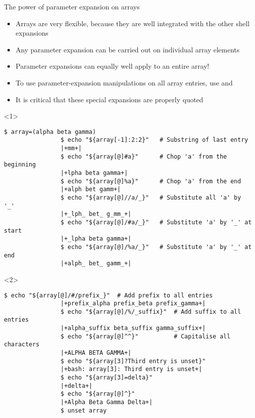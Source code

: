 \begin{frame}[fragile]{The power of parameter expansion on arrays}
    \vspace{-5mm}
    \begin{overlayarea}{\textwidth}{0.7\textheight}
         \begin{itemize}
             \item Arrays are very flexible, because they are well integrated with the other shell expansions
             \item Any parameter expansion can be carried out on individual array elements
             \item Parameter expansions can equally well apply to an entire array!
             \item To use parameter-expansion manipulations on all array entries, use \PB{\texttt{[@]}} and \PB{\texttt{[*]}}
             \item It is critical that these special expansions are properly quoted
         \end{itemize}
        \begin{onlyenv}<1>
            \begin{lstlisting}[style=MyBash, xrightmargin=3mm]
                $ array=(alpha beta gamma)
                $ echo "${array[-1]:2:2}"   # Substring of last entry
                |+mm+|
                $ echo "${array[@]#a}"      # Chop 'a' from the beginning
                |+lpha beta gamma+|
                $ echo "${array[@]%a}"      # Chop 'a' from the end
                |+alph bet gamm+|
                $ echo "${array[@]//a/_}"   # Substitute all 'a' by '_'
                |+_lph_ bet_ g_mm_+|
                $ echo "${array[@]/#a/_}"   # Substitute 'a' by '_' at start
                |+_lpha beta gamma+|
                $ echo "${array[@]/%a/_}"   # Substitute 'a' by '_' at end
                |+alph_ bet_ gamm_+|
            \end{lstlisting}
        \end{onlyenv}
        \begin{onlyenv}<2>
            \begin{lstlisting}[style=MyBash, xrightmargin=3mm, firstnumber=14]
                $ echo "${array[@]/#/prefix_}"  # Add prefix to all entries
                |+prefix_alpha prefix_beta prefix_gamma+|
                $ echo "${array[@]/%/_suffix}"  # Add suffix to all entries
                |+alpha_suffix beta_suffix gamma_suffix+|
                $ echo "${array[@]^^}"          # Capitalise all characters
                |+ALPHA BETA GAMMA+|
                $ echo "${array[3]?Third entry is unset}"
                |+bash: array[3]: Third entry is unset+|
                $ echo "${array[3]=delta}"
                |+delta+|
                $ echo "${array[@]^}"
                |+Alpha Beta Gamma Delta+|
                $ unset array
            \end{lstlisting}
        \end{onlyenv}
    \end{overlayarea}
\end{frame}





